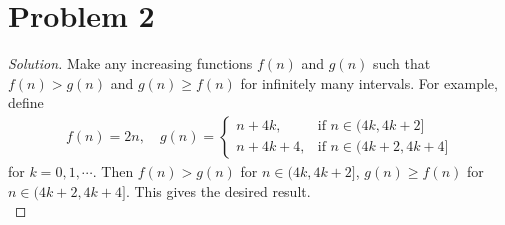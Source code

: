 \section*{Problem 2}
	\begin{proof} [Solution]
		Make any increasing functions $f(n)$ and $g(n)$ such that $f(n) > g(n)$ and $g(n) \geq f(n)$ for infinitely many intervals. For example, define
		\begin{align*}
			f(n) = 2n, \quad g(n) = \begin{cases}
				n + 4k, & \mbox{if }n \in (4k, 4k + 2] \\
				n + 4k + 4, & \mbox{if }n \in (4k + 2, 4k + 4]
			\end{cases}
		\end{align*}
		for $k = 0, 1, \cdots$. Then $f(n) > g(n)$ for $n \in (4k, 4k + 2]$, $g(n) \geq f(n)$ for $n \in (4k + 2, 4k + 4]$. This gives the desired result.\\
	\end{proof}